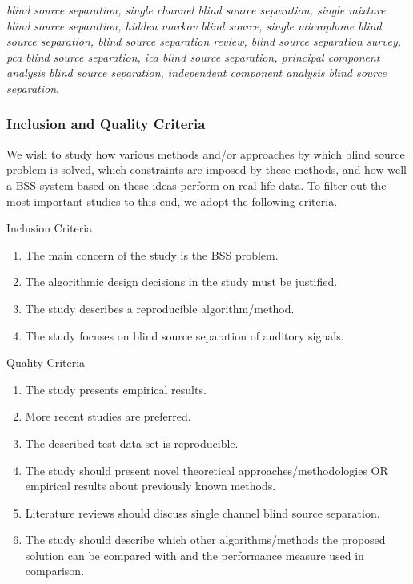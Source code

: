\documentclass[11pt, oneside, a4paper]{report}
\begin{document}
\emph{blind source separation, single channel blind source separation, single mixture blind source separation, hidden markov blind source, single microphone blind source separation, blind source separation review, blind source separation survey, pca blind source separation, ica blind source separation, principal component analysis blind source separation, independent component analysis blind source separation}.



\subsubsection{Inclusion and Quality Criteria}
We wish to study how various methods and/or approaches by which blind source problem is solved, which constraints are imposed by these methods, and how well a BSS system based on these ideas perform on real-life data. To filter out the most important studies to this end, we adopt the following criteria.

\begin{description}
	\item Inclusion Criteria
		\begin{enumerate}
			\item The main concern of the study is the BSS
                          problem.
			\item The algorithmic design decisions in the study must be justified.
			\item The study describes a reproducible algorithm/method.
			\item The study focuses on blind source separation of auditory signals.
		\end{enumerate}
	\item Quality Criteria
		\begin{enumerate}
			\item The study presents empirical results.
			\item More recent studies are preferred.
			\item The described test data set is
                          reproducible.
                        \item The study should present novel
                          theoretical approaches/methodologies OR
                          empirical results about previously known methods. 
			\item Literature reviews should discuss single channel blind source separation.
			\item The study should describe which other algorithms/methods the proposed solution can be compared with and the performance measure used in comparison.
		\end{enumerate}
\end{description}
\end{document}
